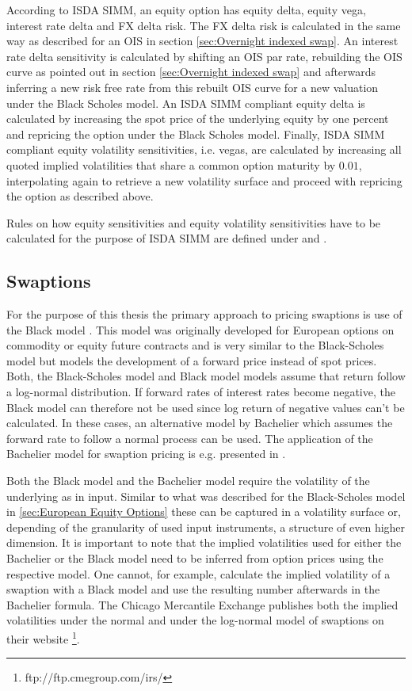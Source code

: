 \documentclass[../Thesis_AHoecherl.tex]{subfiles}
\begin{document}
    According to \gls{ISDA SIMM}, an equity option has equity delta, equity vega, interest rate delta and FX delta risk. The FX delta risk is calculated in the same way as described for an \gls{OIS} in section \ref{sec:Overnight indexed swap}.
    An interest rate delta sensitivity is calculated by shifting an OIS par rate, rebuilding the OIS curve as pointed out in section \ref{sec:Overnight indexed swap} and afterwards inferring a new risk free rate from this rebuilt OIS curve for a new valuation under the Black Scholes model.
    An ISDA SIMM compliant equity delta is calculated by increasing the spot price of the underlying equity by one percent and repricing the option under the Black Scholes model.
    Finally, ISDA SIMM compliant equity volatility sensitivities, i.e. vegas, are calculated by increasing all quoted implied volatilities that share a common option maturity by $0.01$, interpolating again to retrieve a new volatility surface and proceed with repricing the option as described above.

    Rules on how equity sensitivities and equity volatility sensitivities have to be calculated for the purpose of \gls{ISDA SIMM} are defined under \cite[Section 2.5 and 2.8]{RiskDataStandard} and \cite[Points 21, 26 and section C.3]{SIMM}.

    \subsection{Swaptions}

    For the purpose of this thesis the primary approach to pricing swaptions is use of the Black model \cite{black1976pricing}. This model was originally developed for European options on commodity or equity future contracts and is very similar to the Black-Scholes model but models the development of a forward price instead of spot prices.
    Both, the Black-Scholes model and Black model models assume that return follow a log-normal distribution.
    If forward rates of interest rates become negative, the Black model can therefore not be used since log return of negative values can't be calculated.
    In these cases, an alternative model by Bachelier \cite{bachelier1990theorie} which assumes the forward rate to follow a normal process can be used.
    The application of the Bachelier model for swaption pricing is e.g. presented in \cite{floc2016fast}.

    Both the Black model and the Bachelier model require the volatility of the underlying as in input. Similar to what was described for the Black-Scholes model in \ref{sec:European Equity Options} these can be captured in a volatility surface or, depending of the granularity of used input instruments, a structure of even higher dimension.
    It is important to note that the implied volatilities used for either the Bachelier or the Black model need to be inferred from option prices using the respective model.
    One cannot, for example, calculate the implied volatility of a swaption with a Black model and use the resulting number afterwards in the Bachelier formula.
    The Chicago Mercantile Exchange publishes both the implied volatilities under the normal and under the log-normal model of swaptions on their website
    \footnote{ftp://ftp.cmegroup.com/irs/}.
\end{document}
